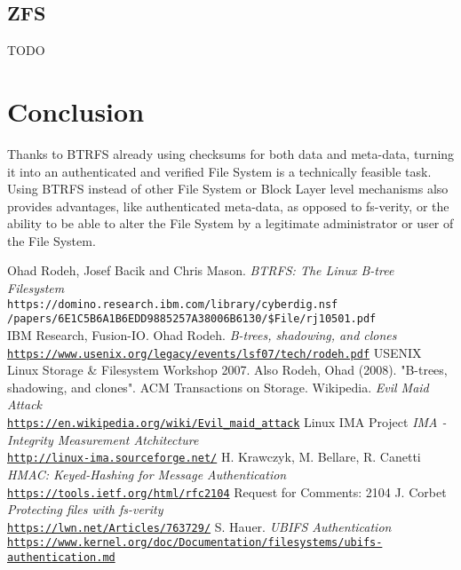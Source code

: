 \documentclass[10pt]{article}
\begin{document}
\subsection{ZFS}
TODO

\section{Conclusion}
Thanks to BTRFS already using checksums for both data and meta-data, turning
it into an authenticated and verified File System is a technically feasible
task.  Using BTRFS instead of other File System or Block Layer level
mechanisms also provides advantages, like authenticated meta-data, as opposed
to fs-verity, or the ability to be able to alter the File System by a
legitimate administrator or user of the File System.

\begin{thebibliography}{9}
	Ohad Rodeh, Josef Bacik and Chris Mason.
	\textit{BTRFS: The Linux B-tree Filesystem}
	\\\texttt{https://domino.research.ibm.com/library/cyberdig.nsf\\/papers/6E1C5B6A1B6EDD9885257A38006B6130/\$File/rj10501.pdf}
	\\IBM Research, Fusion-IO.
	Ohad Rodeh.
	\textit{B-trees, shadowing, and clones}
	\\\texttt{\href{https://www.usenix.org/legacy/events/lsf07/tech/rodeh.pdf}{https://www.usenix.org/legacy/events/lsf07/tech/rodeh.pdf}}
	USENIX Linux Storage \& Filesystem Workshop 2007. Also Rodeh, Ohad (2008). "B-trees, shadowing, and clones". ACM Transactions on Storage.
	Wikipedia.
	\textit{Evil Maid Attack}
	\\\texttt{\href{https://en.wikipedia.org/wiki/Evil\_maid\_attack}{https://en.wikipedia.org/wiki/Evil\_maid\_attack}}
	Linux IMA Project
	\textit{IMA - Integrity Measurement Atchitecture}
	\\\texttt{\href{http://linux-ima.sourceforge.net/}{http://linux-ima.sourceforge.net/}}
	H. Krawczyk, M. Bellare, R. Canetti
	\textit{HMAC: Keyed-Hashing for Message Authentication}
	\\\texttt{\href{https://tools.ietf.org/html/rfc2104}{https://tools.ietf.org/html/rfc2104}}
	Request for Comments: 2104 	
	J. Corbet
	\textit{Protecting files with fs-verity}
	\\\texttt{\href{https://lwn.net/Articles/763729/}{https://lwn.net/Articles/763729/}}
	S. Hauer.
	\textit{UBIFS Authentication}
	\\\texttt{\href{https://www.kernel.org/doc/Documentation/filesystems/ubifs-authentication.md}{https://www.kernel.org/doc/Documentation/filesystems/ubifs-authentication.md}}
\end{thebibliography}
\end{document}

